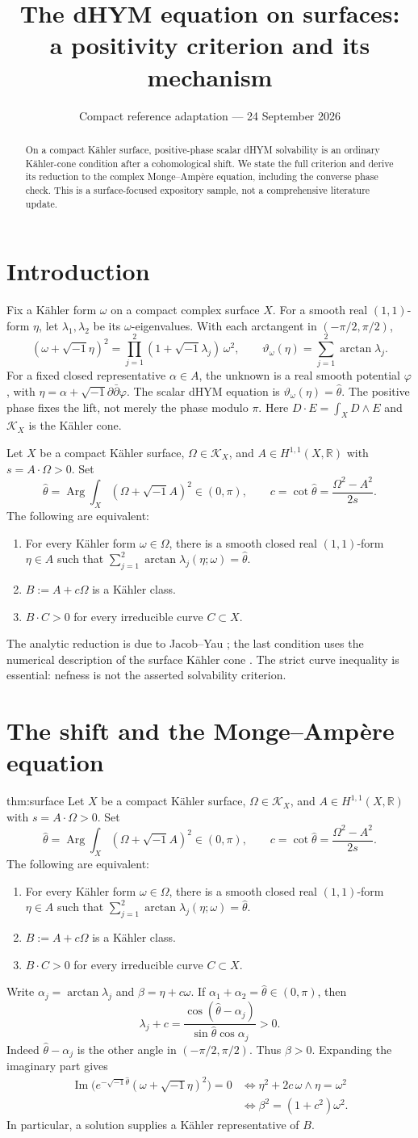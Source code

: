 \documentclass[12pt,reqno]{amsart}
\title[dHYM on surfaces]{The dHYM equation on surfaces:\\a positivity criterion and its mechanism}
\date{Compact reference adaptation --- 24 September 2026}
\newcommand{\ii}{\sqrt{-1}}
\newcommand{\ddc}{\ii\partial\bar\partial}
\newcommand{\K}{\mathcal K}
\newcommand{\SurfaceStatement}{%
Let $X$ be a compact K\"ahler surface, $\Omega\in\K_X$, and
$A\in H^{1,1}(X,\mathbb R)$ with $s=A\cdot\Omega>0$. Set
\[
 \widehat\theta=\operatorname{Arg}\int_X(\Omega+\ii A)^2\in(0,\pi),
 \qquad c=\cot\widehat\theta=\frac{\Omega^2-A^2}{2s}.
\]
The following are equivalent:
\begin{enumerate}
\item For every K\"ahler form $\omega\in\Omega$, there is a smooth closed real
$(1,1)$-form $\eta\in A$ such that
$\sum_{j=1}^2\arctan\lambda_j(\eta;\omega)=\widehat\theta$.
\item $B:=A+c\Omega$ is a K\"ahler class.
\item $B\cdot C>0$ for every irreducible curve $C\subset X$.
\end{enumerate}
}
\begin{document}
\begin{abstract}
On a compact K\"ahler surface, positive-phase scalar dHYM solvability is
an ordinary K\"ahler-cone condition after a cohomological shift. We state
the full criterion and derive its reduction to the complex Monge--Amp\`ere
equation, including the converse phase check. This is a surface-focused
expository sample, not a comprehensive literature update.
\end{abstract}
\maketitle
\section{Introduction}
Fix a K\"ahler form $\omega$ on a compact complex surface $X$.
For a smooth real $(1,1)$-form $\eta$, let $\lambda_1,\lambda_2$ be its
$\omega$-eigenvalues. With each arctangent in $(-\pi/2,\pi/2)$,
\[
 (\omega+\ii\eta)^2
 =\prod_{j=1}^2(1+\ii\lambda_j)\,\omega^2,
 \qquad \vartheta_\omega(\eta)=\sum_{j=1}^2\arctan\lambda_j.
\]
For a fixed closed representative $\alpha\in A$, the unknown is a real
smooth potential $\varphi$, with $\eta=\alpha+\ddc\varphi$.
The scalar dHYM equation is $\vartheta_\omega(\eta)=\widehat\theta$.
The positive phase fixes the lift, not merely the phase modulo $\pi$.
Here $D\cdot E=\int_XD\wedge E$ and $\K_X$ is the K\"ahler cone.

\begin{theorem}\label{thm:surface}
\SurfaceStatement
\end{theorem}
The analytic reduction is due to Jacob--Yau \cite{JY}; the last condition
uses the numerical description of the surface K\"ahler cone \cite{DP}.
The strict curve inequality is essential: nefness is not the asserted
solvability criterion.

\section{The shift and the Monge--Amp\`ere equation}
\begin{theoremrecall}{thm:surface}
\SurfaceStatement
\end{theoremrecall}
Write $\alpha_j=\arctan\lambda_j$ and $\beta=\eta+c\omega$.
If $\alpha_1+\alpha_2=\widehat\theta\in(0,\pi)$, then
\[
 \lambda_j+c
 =\frac{\cos(\widehat\theta-\alpha_j)}
 {\sin\widehat\theta\cos\alpha_j}>0.
\]
Indeed $\widehat\theta-\alpha_j$ is the other angle in
$(-\pi/2,\pi/2)$. Thus $\beta>0$. Expanding the imaginary part gives
\begin{align*}
 \operatorname{Im}\bigl(e^{-\ii\widehat\theta}
                (\omega+\ii\eta)^2\bigr)=0
 &\iff \eta^2+2c\,\omega\wedge\eta=\omega^2\\
 &\iff \beta^2=(1+c^2)\omega^2.
\end{align*}
In particular, a solution supplies a K\"ahler representative of $B$.
\end{document}
